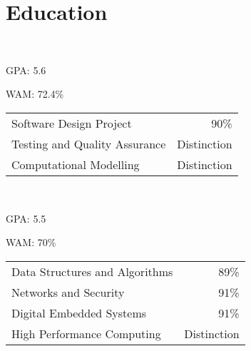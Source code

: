 \documentclass[a4paper]{style}
\begin{document}
\begin{minipage}[t]{0.45\textwidth} %

\section{Education} 
 \\
\vspace{\topsep} %
\vspace{1pt}
\begin{tightitemize}
    \item GPA\@: 5.6
    \item WAM\@: 72.4\%
\end{tightitemize}
\begin{tabular}{l|r}
	Software Design Project & 90\% \\
	Testing and Quality Assurance & Distinction \\
	Computational Modelling & Distinction \\
\end{tabular}

\vspace{\topsep}

\\
\begin{tightitemize}
    \item GPA\@: 5.5
    \item WAM\@: 70\%
\end{tightitemize}
\begin{tabular}{l|r}
    Data Structures and Algorithms & 89\% \\
    Networks and Security & 91\% \\
	Digital Embedded Systems & 91\% \\
    High Performance Computing & Distinction \\
\end{tabular}



\end{minipage}
\end{document}
